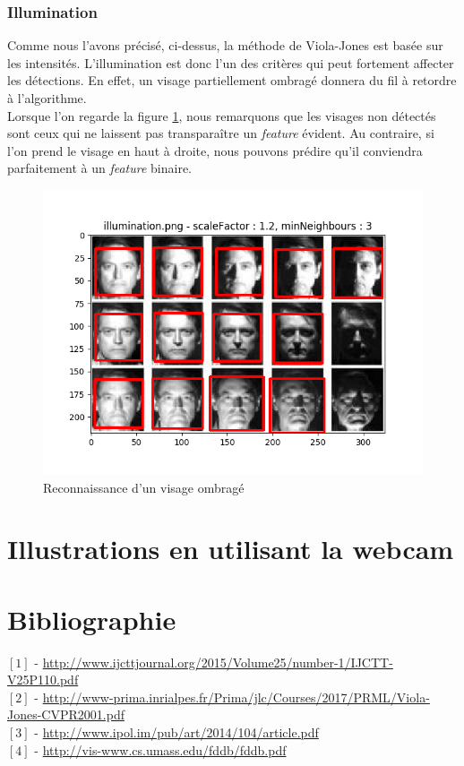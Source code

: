 \documentclass[a4paper,11pt]{article}
\begin{document}
	\subsubsection{Illumination}

	    Comme nous l'avons précisé, ci-dessus, la méthode de Viola-Jones est basée sur les
	    intensités. L'illumination est donc l'un des critères qui peut fortement affecter les
	    détections. En effet, un visage partiellement ombragé donnera du fil à retordre à
	    l'algorithme. \\

	    Lorsque l'on regarde la figure \ref{fig:illumination}, nous remarquons que les visages
	    non détectés sont ceux qui ne laissent pas transparaître un \textit{feature} évident. Au
	    contraire, si l'on prend le visage en haut à droite, nous pouvons prédire qu'il
	    conviendra parfaitement à un \textit{feature} binaire.


	    \begin{figure}[H]
	        \begin{center}
		   \includegraphics[scale = 0.6]{images/illumination_1,2_3.png}
		   \caption{Reconnaissance d'un visage ombragé}
		   \label{fig:illumination}
	        \end{center}
	    \end{figure}
	

\section{Illustrations en utilisant la webcam}

\section{Bibliographie}
\flushleft
$[1]$ - \url{http://www.ijcttjournal.org/2015/Volume25/number-1/IJCTT-V25P110.pdf} \\
$[2]$ - \url{http://www-prima.inrialpes.fr/Prima/jlc/Courses/2017/PRML/Viola-Jones-CVPR2001.pdf} \\
$[3]$ - \url{http://www.ipol.im/pub/art/2014/104/article.pdf} \\
$[4]$ - \url{http://vis-www.cs.umass.edu/fddb/fddb.pdf}
\end{document}
